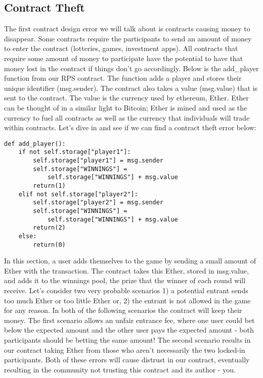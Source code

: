 \documentclass[12pt]{article}
\begin{document}
\subsection{Contract Theft}
The first contract design error we will talk about is contracts causing money to disappear. Some contracts require the participants to send an amount of money to enter the contract (lotteries, games, investment apps). All contracts that require some amount of money to participate have the potential to have that money lost in the contract if things don't go accordingly. Below is the add\_player function from our RPS contract. The function adds a player and stores their unique identifier (msg.sender). The contract also takes a value (msg.value) that is sent to the contract. The value is the currency used by ethereum, Ether. Ether can be thought of in a similar light to Bitcoin; Ether is mined and used as the currency to fuel all contracts as well as the currency that individuals will trade within contracts. Let's dive in and see if we can find a contract theft error below: 

\begin{lstlisting}[frame=single]
def add_player():
	if not self.storage["player1"]:
		self.storage["player1"] = msg.sender
		self.storage["WINNINGS"] = 
			self.storage["WINNINGS"] + msg.value
		return(1)
	elif not self.storage["player2"]:
		self.storage["player2"] = msg.sender
		self.storage["WINNINGS"] = 
			self.storage["WINNINGS"] + msg.value
		return(2)
	else:
		return(0)
\end{lstlisting}

In this section, a user adds themselves to the game by sending a small amount of Ether with the transaction. The contract takes this Ether, stored in msg.value, and adds it to the winnings pool, the prize that the winner of each round will receive. Let's consider two very probable scenarios 1) a potential entrant sends too much Ether or too little Ether or, 2) the entrant is not allowed in the game for any reason. In both of the following scenarios the contract will keep their money. The first scenario allows an unfair entrance fee, where one user could bet below the expected amount and the other user pays the expected amount - both participants should be betting the same amount! The second scenario results in our contract taking Ether from those who aren't necessarily the two locked-in participants. Both of these errors will cause distrust in our contract, eventually resulting in the community not trusting this contract and its author - you.
\end{document}
